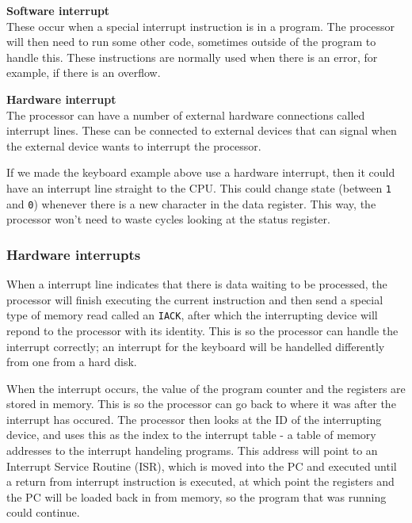 \begin{description}
  \item \textbf{Software interrupt}\\
    These occur when a special interrupt instruction is in a program. The
    processor will then need to run some other code, sometimes outside of the
    program to handle this. These instructions are normally used when there is
    an error, for example, if there is an overflow.
  \item \textbf{Hardware interrupt}\\
    The processor can have a number of external hardware connections called
    interrupt lines. These can be connected to external devices that can signal
    when the external device wants to interrupt the processor.

    If we made the keyboard example above use a hardware interrupt, then it
    could have an interrupt line straight to the CPU. This could change state
    (between \texttt{1} and \texttt{0}) whenever there is a new character in the
    data register. This way, the processor won't need to waste cycles looking at
    the status register.
\end{description}

\subsubsection{Hardware interrupts}


When a interrupt line indicates that there is data waiting to be processed, the
processor will finish executing the current instruction and then send a special
type of memory read called an \texttt{IACK}, after which the interrupting device
will repond to the processor with its identity. This is so the processor can
handle the interrupt correctly; an interrupt for the keyboard will be handelled
differently from one from a hard disk.

When the interrupt occurs, the value of the program counter and the registers
are stored in memory. This is so the processor can go back to where it was after
the interrupt has occured. The processor then looks at the ID of the
interrupting device, and uses this as the index to the interrupt table - a table
of memory addresses to the interrupt handeling programs. This address will point
to an Interrupt Service Routine (ISR), which is moved into the PC and executed
until a return from interrupt instruction is executed, at which point the
registers and the PC will be loaded back in from memory, so the program that was
running could continue.

